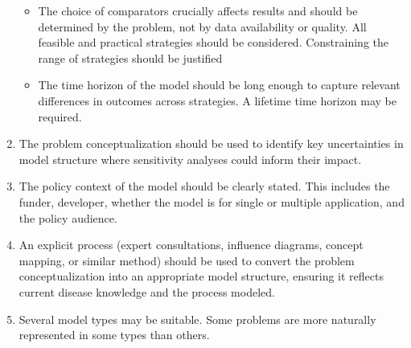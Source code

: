 \documentclass[
]{book}
\providecommand{\tightlist}{%
  \setlength{\itemsep}{0pt}\setlength{\parskip}{0pt}}
\begin{document}
\begin{enumerate}
  \begin{itemize}
  \tightlist
  \item
    The choice of comparators crucially affects results and should be determined by the problem, not by data availability or quality. All feasible and practical strategies should be considered. Constraining the range of strategies should be justified
  \item
    The time horizon of the model should be long enough to capture relevant differences in outcomes across strategies. A lifetime time horizon may be required.
  \end{itemize}
\item
  The problem conceptualization should be used to identify key uncertainties in model structure where sensitivity analyses could inform their impact.
\item
  The policy context of the model should be clearly stated. This includes the funder, developer, whether the model is for single or multiple application, and the policy audience.
\item
  An explicit process (expert consultations, influence diagrams, concept mapping, or similar method) should be used to convert the problem conceptualization into an appropriate model structure, ensuring it reflects current disease knowledge and the process modeled.
\item
  Several model types may be suitable. Some problems are more naturally represented in some types than others.


\end{enumerate}
\end{document}
